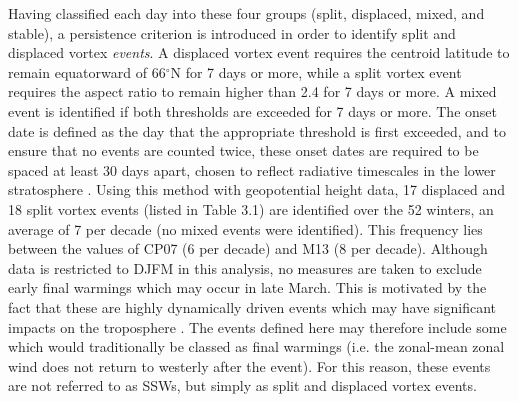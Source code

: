 Having classified each day into these four groups (split, displaced, mixed, and
stable), a persistence criterion is introduced in order to identify split and
displaced vortex \emph{events}. A displaced vortex event requires the centroid
latitude to remain equatorward of 66$^{\circ}$N for 7 days or more, while a
split vortex event requires the aspect ratio to remain higher than 2.4 for 7
days or more. A mixed event is identified if both thresholds are exceeded for 7
days or more. The onset date is defined as the day that the appropriate
threshold is first exceeded, and to ensure that no events are counted twice,
these onset dates are required to be spaced at least 30 days apart, chosen to
reflect radiative timescales in the lower stratosphere \citep{Newman1997}. Using
this method with geopotential height data, 17 displaced and 18 split vortex
events (listed in Table 3.1) are identified over the 52 winters, an average of 7
per decade (no mixed events were identified). This frequency lies between the
values of CP07 (6 per decade) and M13 (8 per decade). Although data is
restricted to DJFM in this analysis, no measures are taken to exclude early
final warmings which may occur in late March. This is motivated by the fact that
these are highly dynamically driven events which may have significant impacts on
the troposphere \citep{Hardiman2011}. The events defined here may therefore
include some which would traditionally be classed as final warmings (i.e. the
zonal-mean zonal wind does not return to westerly after the event). For this
reason, these events are not referred to as SSWs, but simply as split and
displaced vortex events.

